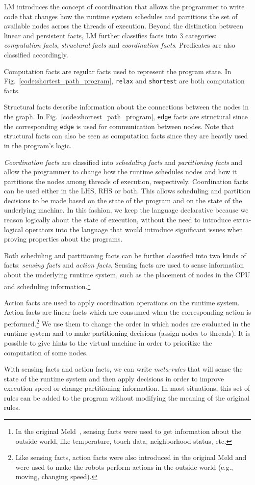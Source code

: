 LM introduces the concept of coordination that allows the programmer to write
code that changes how the runtime system schedules and partitions the set of
available nodes across the threads of execution. Beyond the distinction between
linear and persistent facts, LM further classifies facts into 3 categories:
\emph{computation facts}, \emph{structural facts} and \emph{coordination facts}.
Predicates are also classified accordingly.

Computation facts are regular facts used to represent the program state. In
Fig.~\ref{code:shortest_path_program}, \texttt{relax} and \texttt{shortest} are
both computation facts.

Structural facts describe information about the connections between the nodes in
the graph. In Fig.~\ref{code:shortest_path_program}, \texttt{edge} facts are
structural since the corresponding \texttt{edge} is used for communication
between nodes.  Note that structural facts can also be seen as computation facts
since they are heavily used in the program's logic.

\emph{Coordination facts} are classified into \emph{scheduling facts} and
\emph{partitioning facts} and allow the programmer to change how the runtime
schedules nodes and how it partitions the nodes among threads of execution,
respectively. Coordination facts can be used either in the LHS, RHS or both.
This allows scheduling and partition decisions to be made based on the state of
the program and on the state of the underlying machine.  In this fashion, we
keep the language declarative because we reason logically about the state of
execution, without the need to introduce extra-logical operators into the
language that would introduce significant issues when proving properties about
the programs.

Both scheduling and partitioning facts can be further classified into two kinds
of facts: \emph{sensing facts} and \emph{action facts}. Sensing facts are used
to sense information about the underlying runtime system, such as the placement
of nodes in the CPU and scheduling information.\footnote{In the original
   Meld~\cite{ashley-rollman-iclp09}, sensing facts were used to get information
about the outside world, like temperature, touch data, neighborhood status,
etc.}

Action facts are used to apply coordination operations on the runtime system.
Action facts are linear facts which are consumed when the corresponding action
is performed.\footnote{Like sensing facts, action facts were also introduced in the
original Meld and were used to make the robots perform actions in the outside
world (e.g., moving, changing speed).} We use them to change the order in
which nodes are evaluated in the runtime system and to make partitioning
decisions (assign nodes to threads). It is possible to give hints to the virtual
machine in order to prioritize the computation of some nodes.

With sensing facts and action facts, we can write \emph{meta-rules} that will
sense the state of the runtime system and then apply decisions in order to
improve execution speed or change partitioning information. In most situations,
this set of rules can be added to the program without modifying the meaning of
the original rules.

